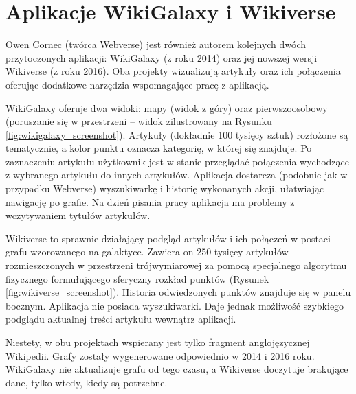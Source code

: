 \section{Aplikacje WikiGalaxy i Wikiverse}

Owen Cornec (twórca Webverse\cite{Webverse}) jest również autorem kolejnych dwóch przytoczonych aplikacji: WikiGalaxy\cite{WikiGalaxy} (z roku 2014) oraz jej nowszej wersji Wikiverse\cite{Wikiverse} (z roku 2016). Oba projekty wizualizują artykuły oraz ich połączenia oferując dodatkowe narzędzia wspomagające pracę z aplikacją.

WikiGalaxy oferuje dwa widoki: mapy (widok z góry) oraz pierwszoosobowy (poruszanie się w przestrzeni – widok zilustrowany na Rysunku \ref{fig:wikigalaxy_screenshot}). Artykuły (dokładnie 100 tysięcy sztuk) rozłożone są tematycznie, a kolor punktu oznacza kategorię, w której się znajduje. Po zaznaczeniu artykułu użytkownik jest w stanie przeglądać połączenia wychodzące z wybranego artykułu do innych artykułów. Aplikacja dostarcza (podobnie jak w przypadku Webverse) wyszukiwarkę i historię wykonanych akcji, ułatwiając nawigację po grafie. Na dzień pisania pracy aplikacja ma problemy z wczytywaniem tytułów artykułów.


Wikiverse to sprawnie działający podgląd artykułów i ich połączeń w postaci grafu wzorowanego na galaktyce. Zawiera on 250 tysięcy artykułów rozmieszczonych w przestrzeni trójwymiarowej za pomocą specjalnego algorytmu fizycznego formułującego sferyczny rozkład punktów (Rysunek \ref{fig:wikiverse_screenshot}). Historia odwiedzonych punktów znajduje się w panelu bocznym. Aplikacja nie posiada wyszukiwarki. Daje jednak możliwość szybkiego podglądu aktualnej treści artykułu wewnątrz aplikacji.

Niestety, w obu projektach wspierany jest tylko fragment anglojęzycznej Wikipedii. Grafy zostały wygenerowane odpowiednio w 2014 i 2016 roku. WikiGalaxy nie aktualizuje grafu od tego czasu, a Wikiverse doczytuje brakujące dane, tylko wtedy, kiedy są potrzebne.

